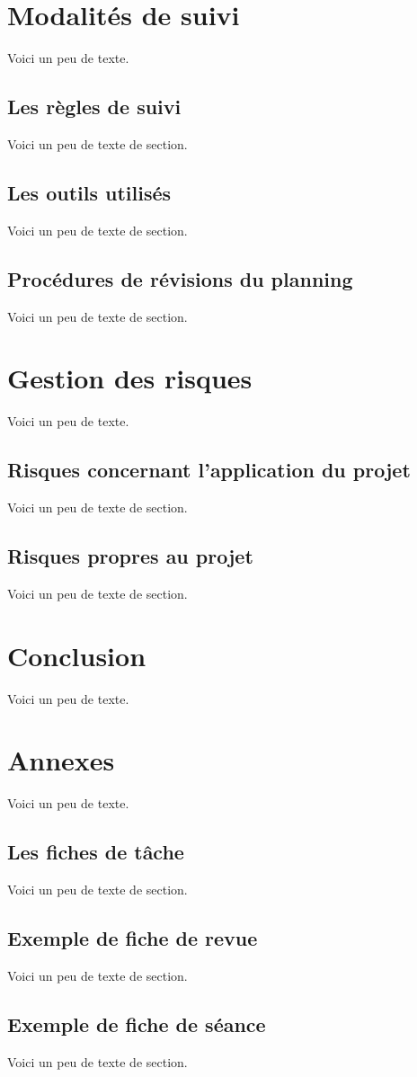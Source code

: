     \chapter{Modalités de suivi}
    Voici un peu de texte.
    \section{Les règles de suivi}
    Voici un peu de texte de section.
    \section{Les outils utilisés}
    Voici un peu de texte de section.
    \section{Procédures de révisions du planning}
    Voici un peu de texte de section.
    
    \chapter{Gestion des risques}
    Voici un peu de texte.
    \section{Risques concernant l'application du projet}
    Voici un peu de texte de section.
    \section{Risques propres au projet}
    Voici un peu de texte de section.
    
    \chapter{Conclusion}
    Voici un peu de texte.
    
    \chapter{Annexes}
    Voici un peu de texte.
    \section{Les fiches de tâche}
    Voici un peu de texte de section.
    \section{Exemple de fiche de revue}
    Voici un peu de texte de section.
    \section{Exemple de fiche de séance}
    Voici un peu de texte de section.




